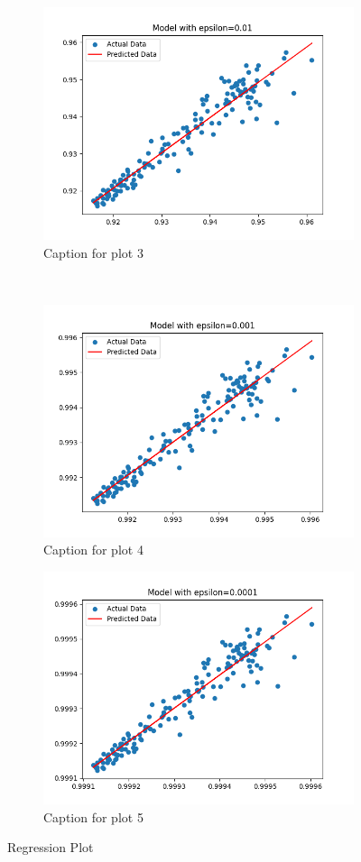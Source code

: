 \begin{figure}[h!]
        \begin{subfigure}[b]{0.3\textwidth}
            \includegraphics[width=.8\linewidth]{plots/epsilon_0.01}
            \caption{Caption for plot 3}
        \end{subfigure}\\
        \begin{subfigure}[b]{0.3\textwidth}
            \includegraphics[width=.8\linewidth]{plots/epsilon_0.001}
            \caption{Caption for plot 4}
        \end{subfigure} \quad
        \begin{subfigure}[b]{0.3\textwidth}
            \includegraphics[width=.8\linewidth]{plots/epsilon_0.0001}
            \caption{Caption for plot 5}
        \end{subfigure}
        \caption{Regression Plot}
    \end{figure}


